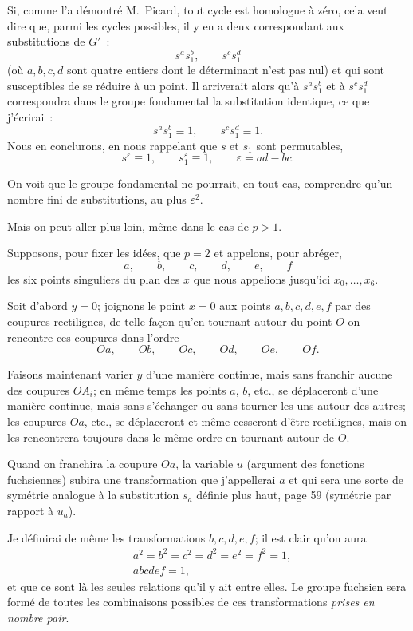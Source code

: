 \documentclass{article}
\begin{document}
Si, comme l'a démontré M.~Picard, tout cycle est homologue à zéro, cela veut dire que, parmi les cycles possibles, il y en a deux correspondant aux substitutions de $G'$~:
\[ s^{a} s^{b}_{1}, \qquad s^{c} s^{d}_{1} \]
(où $a, b, c, d$ sont quatre entiers dont le déterminant n'est pas nul) et qui sont susceptibles de se réduire à un point. Il arriverait alors qu'à $s^{a} s^{b}_{1}$ et à $s^{c} s^{d}_{1}$ correspondra dans le groupe fondamental la substitution identique, ce que j'écrirai~:
\[ s^{a} s^{b}_{1} \equiv 1, \qquad s^{c} s^{d}_{1} \equiv 1. \]
Nous en conclurons, en nous rappelant que $s$ et $s_{1}$ sont permutables,
\[ s^{\varepsilon} \equiv 1, \qquad s^{\varepsilon}_{1} \equiv 1, \qquad \varepsilon = ad - bc. \]

On voit que le groupe fondamental ne pourrait, en tout cas, comprendre qu'un nombre fini de substitutions, au plus $\varepsilon^{2}$.

Mais on peut aller plus loin, même dans le cas de $p > 1$.

Supposons, pour fixer les idées, que $p = 2$ et appelons, pour abréger,
\[ a, \qquad b, \qquad c, \qquad d, \qquad e, \qquad f \]
les six points singuliers du plan des $x$ que nous appelions jusqu'ici $x_{0}, \ldots, x_{6}$.

Soit d'abord $y = 0$; joignons le point $x = 0$ aux points $a, b, c, d, e, f$ par des coupures rectilignes, de telle façon qu'en tournant autour du point $O$ on rencontre ces coupures dans l'ordre
\[ Oa, \qquad Ob, \qquad Oc, \qquad Od, \qquad Oe, \qquad Of. \]

Faisons maintenant varier $y$ d'une manière continue, mais sans franchir aucune des coupures $OA_{i}$; en même temps les points $a$,
$b$, etc., se déplaceront d'une manière continue, mais sans s'échanger ou sans tourner les uns autour des autres; les coupures $Oa$, etc., se déplaceront et même cesseront d'être rectilignes, mais on les rencontrera toujours dans le même ordre en tournant autour de $O$.

Quand on franchira la coupure $Oa$, la variable $u$ (argument des fonctions fuchsiennes) subira une transformation que j'appellerai $a$ et qui sera une sorte de symétrie analogue à la substitution $s_{a}$ définie plus haut, page 59 (symétrie par rapport à $u_{a}$).

Je définirai de même les transformations $b, c, d, e, f$; il est clair qu'on aura
\[ \begin{aligned} &a^{2} = b^{2} = c^{2} = d^{2} = e^{2} = f^{2} = 1,\\ &abcdef = 1, \end{aligned} \]
et que ce sont là les seules relations qu'il y ait entre elles. Le groupe fuchsien sera formé de toutes les combinaisons possibles de ces transformations \emph{prises en nombre pair}.
\end{document}
